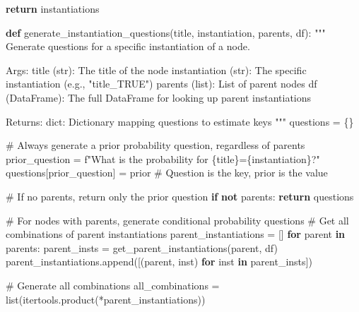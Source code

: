 \documentclass[
  11pt,
  letterpaper,
]{book}
\newenvironment{Shaded}{\begin{snugshade}}{\end{snugshade}}
\newcommand{\BuiltInTok}[1]{\textcolor[rgb]{0.00,0.23,0.31}{#1}}
\newcommand{\CommentTok}[1]{\textcolor[rgb]{0.37,0.37,0.37}{#1}}
\newcommand{\ControlFlowTok}[1]{\textcolor[rgb]{0.00,0.23,0.31}{\textbf{#1}}}
\newcommand{\KeywordTok}[1]{\textcolor[rgb]{0.00,0.23,0.31}{\textbf{#1}}}
\newcommand{\NormalTok}[1]{\textcolor[rgb]{0.00,0.23,0.31}{#1}}
\newcommand{\OperatorTok}[1]{\textcolor[rgb]{0.37,0.37,0.37}{#1}}
\newcommand{\SpecialCharTok}[1]{\textcolor[rgb]{0.37,0.37,0.37}{#1}}
\newcommand{\SpecialStringTok}[1]{\textcolor[rgb]{0.13,0.47,0.30}{#1}}
\newcommand{\StringTok}[1]{\textcolor[rgb]{0.13,0.47,0.30}{#1}}
\begin{document}
\begin{Shaded}
\begin{Highlighting}[]
    \ControlFlowTok{return}\NormalTok{ instantiations}

\KeywordTok{def}\NormalTok{ generate\_instantiation\_questions(title, instantiation, parents, df):}
    \CommentTok{"""}
\CommentTok{    Generate questions for a specific instantiation of a node.}

\CommentTok{    Args:}
\CommentTok{        title (str): The title of the node}
\CommentTok{        instantiation (str): The specific instantiation (e.g., "title\_TRUE")}
\CommentTok{        parents (list): List of parent nodes}
\CommentTok{        df (DataFrame): The full DataFrame for looking up parent instantiations}

\CommentTok{    Returns:}
\CommentTok{        dict: Dictionary mapping questions to estimate keys}
\CommentTok{    """}
\NormalTok{    questions }\OperatorTok{=}\NormalTok{ \{\}}

    \CommentTok{\# Always generate a prior probability question, regardless of parents}
\NormalTok{    prior\_question }\OperatorTok{=} \SpecialStringTok{f"What is the probability for }\SpecialCharTok{\{}\NormalTok{title}\SpecialCharTok{\}}\SpecialStringTok{=}\SpecialCharTok{\{}\NormalTok{instantiation}\SpecialCharTok{\}}\SpecialStringTok{?"}
\NormalTok{    questions[prior\_question] }\OperatorTok{=} \StringTok{\textquotesingle{}prior\textquotesingle{}} \CommentTok{\# Question is the key, \textquotesingle{}prior\textquotesingle{} is the value}

    \CommentTok{\# If no parents, return only the prior question}
    \ControlFlowTok{if} \KeywordTok{not}\NormalTok{ parents:}
        \ControlFlowTok{return}\NormalTok{ questions}

    \CommentTok{\# For nodes with parents, generate conditional probability questions}
    \CommentTok{\# Get all combinations of parent instantiations}
\NormalTok{    parent\_instantiations }\OperatorTok{=}\NormalTok{ []}
    \ControlFlowTok{for}\NormalTok{ parent }\KeywordTok{in}\NormalTok{ parents:}
\NormalTok{        parent\_insts }\OperatorTok{=}\NormalTok{ get\_parent\_instantiations(parent, df)}
\NormalTok{        parent\_instantiations.append([(parent, inst) }\ControlFlowTok{for}\NormalTok{ inst }\KeywordTok{in}\NormalTok{ parent\_insts])}

    \CommentTok{\# Generate all combinations}
\NormalTok{    all\_combinations }\OperatorTok{=} \BuiltInTok{list}\NormalTok{(itertools.product(}\OperatorTok{*}\NormalTok{parent\_instantiations))}


\end{Highlighting}
\end{Shaded}
\end{document}
